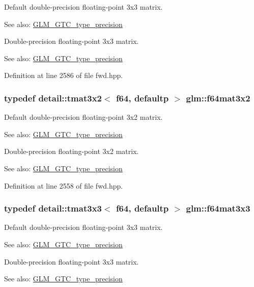 Default double-precision floating-point 3x3 matrix. \begin{Desc}
\item[See also:]\hyperlink{group__gtc__type__precision}{GLM\_\-GTC\_\-type\_\-precision}\end{Desc}
Double-precision floating-point 3x3 matrix. \begin{Desc}
\item[See also:]\hyperlink{group__gtc__type__precision}{GLM\_\-GTC\_\-type\_\-precision} \end{Desc}


Definition at line 2586 of file fwd.hpp.\hypertarget{group__gtc__type__precision_ge6388c7664b5bb281047a9fd7984f97b}{
\subsubsection[f64mat3x2]{\setlength{\rightskip}{0pt plus 5cm}typedef detail::tmat3x2$<$ f64, defaultp $>$ {\bf glm::f64mat3x2}}}
\label{group__gtc__type__precision_ge6388c7664b5bb281047a9fd7984f97b}


Default double-precision floating-point 3x2 matrix. \begin{Desc}
\item[See also:]\hyperlink{group__gtc__type__precision}{GLM\_\-GTC\_\-type\_\-precision}\end{Desc}
Double-precision floating-point 3x2 matrix. \begin{Desc}
\item[See also:]\hyperlink{group__gtc__type__precision}{GLM\_\-GTC\_\-type\_\-precision} \end{Desc}


Definition at line 2558 of file fwd.hpp.\hypertarget{group__gtc__type__precision_gd74db0197015b8d1d77ce54cf8d0ae60}{
\subsubsection[f64mat3x3]{\setlength{\rightskip}{0pt plus 5cm}typedef detail::tmat3x3$<$ f64, defaultp $>$ {\bf glm::f64mat3x3}}}
\label{group__gtc__type__precision_gd74db0197015b8d1d77ce54cf8d0ae60}


Default double-precision floating-point 3x3 matrix. \begin{Desc}
\item[See also:]\hyperlink{group__gtc__type__precision}{GLM\_\-GTC\_\-type\_\-precision}\end{Desc}
Double-precision floating-point 3x3 matrix. \begin{Desc}
\item[See also:]\hyperlink{group__gtc__type__precision}{GLM\_\-GTC\_\-type\_\-precision} \end{Desc}


